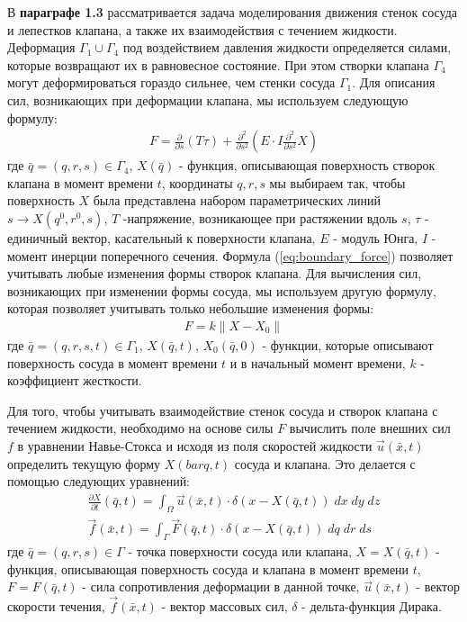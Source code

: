 В \textbf{параграфе 1.3} рассматривается задача моделирования движения стенок
сосуда и лепестков клапана, а также их взаимодействия с течением жидкости.
Деформация $\Gamma_1 \cup \Gamma_4$ под воздействием давления жидкости
определяется силами, которые возвращают их в равновесное состояние. При этом
створки клапана $\Gamma_4$ могут деформироваться гораздо сильнее, чем стенки
сосуда $\Gamma_1$. Для описания сил, возникающих при деформации клапана, мы
используем следующую формулу:
\begin{gather}
    \label{eq:boundary_force}
    F = \frac{\partial}{\partial s} (T \tau) + \frac{\partial^2}{\partial s^2} (E \cdot I \frac{\partial^2}{\partial s^2} X)
\end{gather}
где $\bar{q}=(q, r, s) \in \Gamma_4$, $X(\bar{q})$ - функция, описывающая
поверхность створок клапана в момент времени $t$, координаты $q, r, s$ мы
выбираем так, чтобы поверхность $X$ была представлена набором параметрических
линий $s \rightarrow X(q^0, r^0, s)$, $T$ -напряжение, возникающее при
растяжении вдоль $s$, $\tau$ - единичный вектор, касательный к поверхности
клапана, $E$ - модуль Юнга, $I$ - момент инерции поперечного сечения. Формула
(\ref{eq:boundary_force}) позволяет учитывать любые изменения формы створок
клапана.  Для вычисления сил, возникающих при изменении формы сосуда, мы
используем другую формулу, которая позволяет учитывать только небольшие
изменения формы:
\begin{gather}
    \label{eq:boundary_force_simple}
    F = k \|X - X_0\|
\end{gather}
где $\bar{q} = (q, r, s, t) \in \Gamma_1$, $X(\bar{q}, t)$, $X_0(\bar{q}, 0)$ -
функции, которые описывают поверхность сосуда в момент времени $t$ и в
начальный момент времени, $k$ - коэффициент жесткости.

Для того, чтобы учитывать взаимодействие стенок сосуда и створок клапана с
течением жидкости, необходимо на основе силы $F$ вычислить поле внешних сил $f$
в уравнении Навье-Стокса и исходя из поля скоростей жидкости $\vec{u}(\bar{x},
t)$ определить текущую форму $X(bar{q}, t)$ сосуда и клапана. Это делается с
помощью следующих уравнений:
\begin{gather}
    \label{eq:interaction:velocity}
    \frac{\partial X}{\partial t}(\bar{q}, t) = \int_{\Omega} \vec{u}(\bar{x}, t) \cdot \delta (x - X(\bar{q}, t))\; dx\; dy\; dz\\
    \label{eq:interaction:force}
    \vec{f}(\bar{x}, t) = \int_{\Gamma} \vec{F}(\bar{q}, t) \cdot \delta (x - X(\bar{q}, t))\; dq\; dr\; ds
\end{gather}
где $\bar{q} = (q, r, s) \in \Gamma$ - точка поверхности сосуда или клапана, $X
= X(\bar{q}, t)$ - функция, описывающая поверхность сосуда и клапана в момент
времени $t$, $F = F(\bar{q}, t)$ - сила сопротивления деформации в данной
точке, $\vec{u}(\bar{x}, t)$ - вектор скорости течения, $\vec{f}(\bar{x}, t)$ -
вектор массовых сил, $\delta$ - дельта-функция Дирака.

